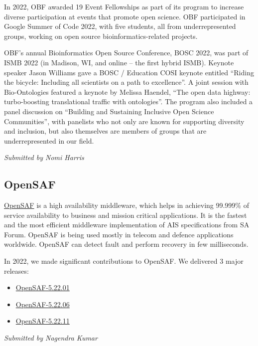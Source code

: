 \documentclass[a4paper]{report}
\begin{document}
In 2022, OBF awarded 19 Event Fellowships as part of its program to increase diverse participation at events that promote open science. OBF participated in Google Summer of Code 2022, with five students, all from underrepresented groups, working on open source bioinformatics-related projects.

OBF's annual Bioinformatics Open Source Conference, BOSC 2022, was part of ISMB 2022 (in Madison, WI, and online – the first hybrid ISMB). Keynote speaker Jason Williams gave a BOSC / Education COSI keynote entitled ``Riding the bicycle: Including all scientists on a path to excellence''. A joint session with Bio-Ontologies featured a keynote by Melissa Haendel, ``The open data highway: turbo-boosting translational traffic with ontologies''. The program also included a panel discussion on ``Building and Sustaining Inclusive Open Science Communities'', with panelists who not only are known for supporting diversity and inclusion, but also themselves are members of groups that are underrepresented in our field.

{\em Submitted by Nomi Harris}

\subsection{OpenSAF}

\href{https://opensaf.sourceforge.io/}{OpenSAF} is a high availability middleware, which helps in achieving 99.999\% of service availability to business and mission critical applications. It is the fastest and the most efficient middleware implementation of AIS specifications from SA Forum. OpenSAF is being used mostly in telecom and defence applications worldwide. OpenSAF can detect fault and perform recovery in few milliseconds.

In 2022, we made significant contributions to OpenSAF. We delivered 3 major releases:

\begin{itemize}

\item \href{https://sourceforge.net/p/opensaf/wiki/NEWS-5.22.01/}{OpenSAF-5.22.01}
\item \href{https://sourceforge.net/p/opensaf/wiki/NEWS-5.22.06/}{OpenSAF-5.22.06}
\item \href{https://sourceforge.net/p/opensaf/wiki/NEWS-5.22.11/}{OpenSAF-5.22.11}

\end{itemize}

{\em Submitted by Nagendra Kumar}
\end{document}
